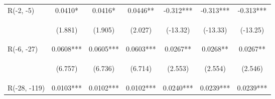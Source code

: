 \documentclass[border=0.2cm]{standalone}
\begin{document}
\begin{tabular}{lcccccc}
    R(-2, -5)              & 0.0410*                                        & 0.0416*                                        & 0.0446**                                       & -0.312***                                      & -0.313***                                      & -0.313***                                      \\
    \vspace{4pt}           & \begin{footnotesize}(1.881)\end{footnotesize}  & \begin{footnotesize}(1.905)\end{footnotesize}  & \begin{footnotesize}(2.027)\end{footnotesize}  & \begin{footnotesize}(-13.32)\end{footnotesize} & \begin{footnotesize}(-13.33)\end{footnotesize} & \begin{footnotesize}(-13.25)\end{footnotesize} \\
    R(-6, -27)             & 0.0608***                                      & 0.0605***                                      & 0.0603***                                      & 0.0267**                                       & 0.0268**                                       & 0.0267**                                       \\
    \vspace{4pt}           & \begin{footnotesize}(6.757)\end{footnotesize}  & \begin{footnotesize}(6.736)\end{footnotesize}  & \begin{footnotesize}(6.714)\end{footnotesize}  & \begin{footnotesize}(2.553)\end{footnotesize}  & \begin{footnotesize}(2.554)\end{footnotesize}  & \begin{footnotesize}(2.546)\end{footnotesize}  \\
    R(-28, -119)           & 0.0103***                                      & 0.0102***                                      & 0.0102***                                      & 0.0240***                                      & 0.0239***                                      & 0.0239***                                      \\

\end{tabular}
\end{document}
